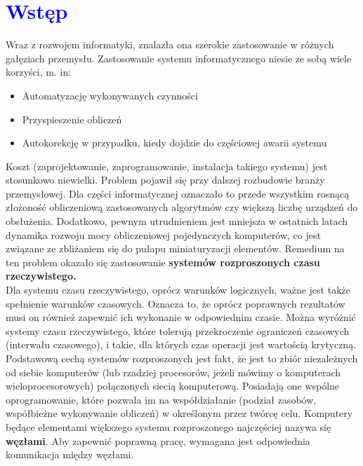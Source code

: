 \documentclass[a4paper,twoside]{article}
\begin{document}
\section{\textcolor{blue}{Wstęp}}

Wraz z rozwojem informatyki, znalazła ona szerokie zastosowanie w różnych gałęziach przemysłu.  Zastosowanie systemu informatycznego niesie ze sobą wiele korzyści, m. in: \\
\begin{itemize}
	\item Automatyzację wykonywanych czynności \\
	\item Przyspieszenie obliczeń \\
	\item Autokorekcję w przypadku, kiedy dojdzie do częściowej awarii systemu \\
\end{itemize}

Koszt (zaprojektowanie, zaprogramowanie, instalacja takiego systemu) jest stosunkowo niewielki. Problem pojawił się przy dalszej rozbudowie branży przemysłowej. Dla części informatycznej oznaczało to przede wszystkim rosnącą złożoność obliczeniową zastosowanych algorytmów czy większą liczbę urządzeń do obsłużenia. Dodatkowo, pewnym utrudnieniem jest mniejsza w ostatnich latach dynamika rozwoju mocy obliczeniowej pojedynczych komputerów, co jest związane ze zbliżaniem się do pułapu miniaturyzacji elementów. Remedium na ten problem okazało się zastosowanie \textbf{systemów rozproszonych czasu rzeczywistego.} \\

Dla systemu czasu rzeczywistego, oprócz warunków logicznych, ważne jest także spełnienie warunków czasowych. Oznacza to, że oprócz poprawnych rezultatów musi on również zapewnić ich wykonanie w odpowiednim czasie. Można wyróżnić systemy czasu rzeczywistego, które tolerują przekroczenie ograniczeń czasowych (interwału czasowego), i takie, dla których czas operacji jest wartością krytyczną. \\

Podstawową cechą systemów rozproszonych jest fakt, że jest to zbiór niezależnych od siebie komputerów (lub rzadziej procesorów, jeżeli mówimy o komputerach wieloprocesorowych) połączonych siecią komputerową. Posiadają one wspólne oprogramowanie, które pozwala im na współdziałanie (podział zasobów, współbieżne wykonywanie obliczeń) w określonym przez twórcę celu. Komputery będące elementami większego systemu rozproszonego najczęściej nazywa się \textbf{węzłami}. Aby zapewnić poprawną pracę, wymagana jest odpowiednia komunikacja między węzłami.
\end{document}
